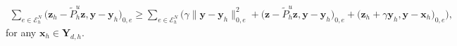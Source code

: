 \documentclass[smallextended]{svjour3}
\renewenvironment{proof}{\noindent{\it Proof.}}{\hfill$\square$}
\numberwithin{equation}{section}
\numberwithin{figure}{section}
\numberwithin{table}{section}
\newcommand\bPi{\boldsymbol{\Pi}}
\newcommand{\tP}{\tilde{P}}
\newcommand\buu{\underline{\boldsymbol{u}}}
\newcommand\buz{\underline{\boldsymbol{z}}}
\newcommand\bx{\boldsymbol{x}}
\newcommand\by{\boldsymbol{y}}
\newcommand\bz{\boldsymbol{z}}
\newcommand{\bYd}{\boldsymbol{Y}_d}
\newcommand{\bY}{\boldsymbol{Y}}
\newcommand\cT{\mathcal{T}}
\newcommand{\bbV}{\mathbb{V}}
\begin{document}
	\begin{align*}
		\sum_{e \in \mathcal{E}_h^N} \big( \bz_h - \tP_h^u \bz, \by - \by_h \big)_{0,e} \ge  \sum_{e \in \mathcal{E}_h^N} \Big( \gamma \| \by - \by_h \|_{0,e}^2 + \big( \bz - \tP_h^u \bz, \by - \by_h \big)_{0,e} +  \big( \bz_h + \gamma \by_h, \by - \bx_h \big)_{0,e} \Big),
	\end{align*}
for any $\bx_h \in \bY_{d,h}$.
\end{document}
